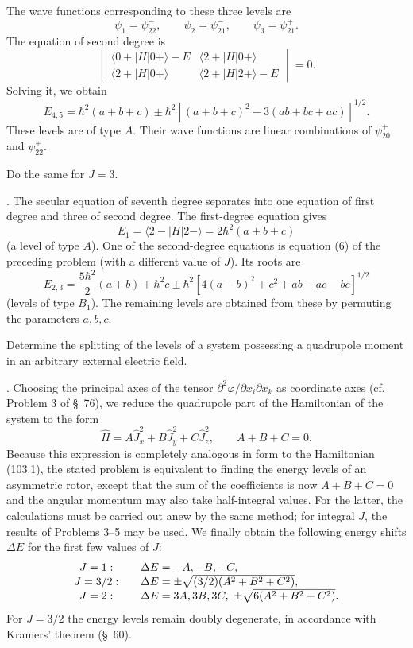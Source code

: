 The wave functions corresponding to these three levels are
\[
 \psi_1=\psi_{22}^-,\qquad \psi_2=\psi_{21}^-,\qquad \psi_3=\psi_{21}^+.
\]
The equation of second degree is
\begin{equation}
 \begin{vmatrix}
 \langle0+|H|0+\rangle-E&\langle2+|H|0+\rangle\\
 \langle2+|H|0+\rangle&\langle2+|H|2+\rangle-E
 \end{vmatrix}=0. \tag{6}
\end{equation}
Solving it, we obtain
\begin{equation}
 E_{4,5}=\hbar^2(a+b+c)\pm\hbar^2[(a+b+c)^2-3(ab+bc+ac)]^{1/2}. \tag{7}
\end{equation}
These levels are of type $A$. Their wave functions are linear combinations of $\psi_{20}^+$ and $\psi_{22}^+$.

 Do the same for $J=3$.

\SolutionHeading. The secular equation of seventh degree separates into one equation of first degree and three of second degree. The first-degree equation gives
\begin{equation}
 E_1=\langle2-|H|2-\rangle=2\hbar^2(a+b+c) \tag{8}
\end{equation}
(a level of type $A$). One of the second-degree equations is equation (6) of the preceding problem (with a different value of $J$). Its roots are
\begin{equation}
 E_{2,3}=\frac{5\hbar^2}{2}(a+b)+\hbar^2c\pm\hbar^2[4(a-b)^2+c^2+ab-ac-bc]^{1/2} \tag{9}
\end{equation}
(levels of type $B_1$). The remaining levels are obtained from these by permuting the parameters $a,b,c$.

 Determine the splitting of the levels of a system possessing a quadrupole moment in an arbitrary external electric field.

\SolutionHeading. Choosing the principal axes of the tensor $\partial^2\varphi/\partial x_i\partial x_k$ as coordinate axes (cf. Problem 3 of \S~76), we reduce the quadrupole part of the Hamiltonian of the system to the form
\[
 \hat H=A\hat J_x^2+B\hat J_y^2+C\hat J_z^2,\qquad A+B+C=0.
\]
Because this expression is completely analogous in form to the Hamiltonian (103.1), the stated problem is equivalent to finding the energy levels of an asymmetric rotor, except that the sum of the coefficients is now $A+B+C=0$ and the angular momentum may also take half-integral values. For the latter, the calculations must be carried out anew by the same method; for integral $J$, the results of Problems 3--5 may be used. We finally obtain the following energy shifts $\Delta E$ for the first few values of $J$:
\[
\begin{array}{c@{\qquad}l}
J=1:&\Delta E=-A,-B,-C,\\
J=3/2:&\Delta E=\pm\sqrt{(3/2)(A^2+B^2+C^2)},\\
J=2:&\Delta E=3A,3B,3C,\ \pm\sqrt{6(A^2+B^2+C^2)}.
\end{array}
\]
For $J=3/2$ the energy levels remain doubly degenerate, in accordance with Kramers' theorem (\S~60).
